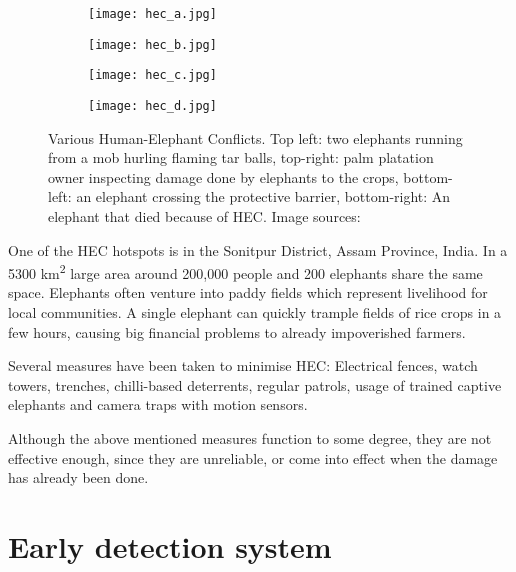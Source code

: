 \begin{figure}[ht]
    \begin{subfigure}{0.5\textwidth}
        \centering
        \texttt{[image: hec\_a.jpg]} 
    \end{subfigure}
    \begin{subfigure}{0.5\textwidth}
        \centering
        \texttt{[image: hec\_b.jpg]} 
    \end{subfigure}
    \begin{subfigure}{0.5\textwidth}
        \centering
        \texttt{[image: hec\_c.jpg]} 
    \end{subfigure}
    \begin{subfigure}{0.5\textwidth}
        \centering
        \texttt{[image: hec\_d.jpg]} 
    \end{subfigure}
\caption[Various Human-Elephant Conflicts.] {Various Human-Elephant Conflicts. Top left: two elephants running from a mob hurling flaming tar balls, top-right: palm platation owner inspecting damage done by elephants to the crops, bottom-left: an elephant crossing the protective barrier, bottom-right: An elephant that died because of HEC. Image sources:\cite{wildlabs-elephants}\cite{econe_image}\cite{save_our_species_image}\cite{the_week_image}}
    \label{various_hec}
\end{figure}

One of the HEC hotspots is in the Sonitpur District, Assam Province, India. 
In a 5300 km\textsuperscript{2} large area around 200,000 people and 200 elephants share the same space\cite{wildlabs-elephants}.
Elephants often venture into paddy fields which represent livelihood for local communities.
A single elephant can quickly trample fields of rice crops in a few hours, causing big financial problems to already impoverished farmers\cite{wildlabs-elephants}.

Several measures have been taken to minimise HEC: Electrical fences, watch towers, trenches, chilli-based deterrents, regular patrols, usage of trained captive elephants and camera traps with motion sensors.

Although the above mentioned measures function to some degree, they are not effective enough, since they are unreliable, or come into effect when the damage has already been done\cite{wildlabs}. 

\section{ Early detection system}\label{early_detection_system}

